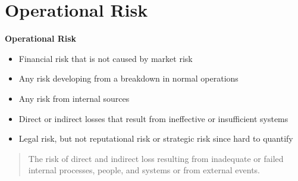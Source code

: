 \documentclass[11pt,fleqn]{book} %
\numberwithin{equation}{section} %
\numberwithin{figure}{section} %
\numberwithin{table}{section} %
\begin{document}
\chapter{Operational Risk}
\begin{definition}\textbf{Operational Risk}
    \begin{itemize}
        \item Financial risk that is not caused by market risk
        \item Any risk developing from a breakdown in normal operations
        \item Any risk from internal sources
        \item Direct or indirect losses that result from ineffective or insufficient systems
        \item Legal risk, but not reputational risk or strategic risk since hard to quantify
    \end{itemize}
    \begin{quotation}
        The risk of direct and indirect loss resulting from inadequate or failed internal processes, people, and systems or from external events.
    \end{quotation}
\end{definition}
\end{document}

